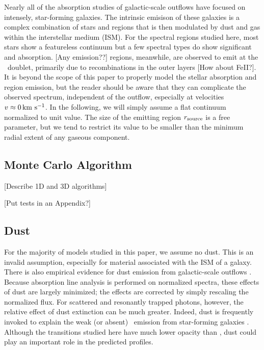 \documentclass[12pt,preprint]{aastex}
\begin{document}
Nearly all of the absorption studies of galactic-scale outflows 
have focused on intensely, star-forming galaxies.  The
intrinsic emisison of these galaxies is a complex combination of
stars and  regions that is then modulated by dust and gas
within the interstellar medium (ISM).  For the spectral regions studied
here, most stars show a featureless continuum but a few spectral
types do show significant  and  absorption.
[Any emission??]   regions, meanwhile, are observed to emit
at the \mgiid\ doublet, primarily due to recombinations in the outer
layers [How about FeII?].  It is beyond the scope of this paper to
properly model the 
stellar absorption and  region emission, but the reader
should be aware that they can complicate the observed spectrum,
independent of the outflow, especially at velocities $v \approx 0 \, {\rm km~s^{-1}}$.
In the following, we will simply assume a flat continuum 
normalized to unit value.  The size of the emitting
region $r_{\rm source}$ is a free parameter, but we tend to
restrict its value to be smaller than the minimum radial extent of any
gaseous component.


\subsection{Monte Carlo Algorithm}

[Describe 1D and 3D algorithms]

[Put tests in an Appendix?]

\subsection{Dust}
\label{sec:dust_method}

For the majority of models studied in this paper, we assume no dust.
This is an invalid assumption, especially for material associated with
the ISM of a galaxy.  
There is also empirical evidence for dust emission from galactic-scale
outflows \citep[e.g.][]{M87_dust}.
Because absorption line analysis is performed
on normalized spectra, these effects of dust are largely minimized; 
the effects are corrected by simply rescaling the normalized flux.  For
scattered and resonantly trapped photons, however, the relative effect of dust
extinction can be much greater.  Indeed, dust is frequently invoked to
explain the weak (or absent) \lya\ emission from star-forming galaxies
\citep[e.g.][]{shapley03}.  Although the transitions studied here have
much lower opacity than \lya, dust could play an important role
in the predicted profiles.
\end{document}
